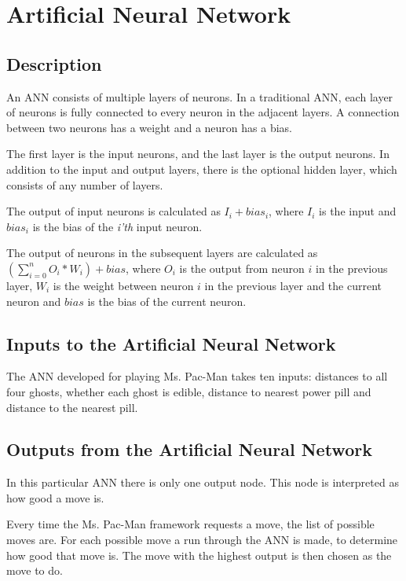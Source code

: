 
\section{Artificial Neural Network}
\subsection{Description}
An ANN consists of multiple layers of neurons. In a traditional ANN, each layer of neurons is fully connected to every neuron in the adjacent layers. A connection between two neurons has a weight and a neuron has a bias. 

The first layer is the input neurons, and the last layer is the output neurons. In addition to the input and output layers, there is the optional hidden layer, which consists of any number of layers.

The output of input neurons is calculated as $ I_i + bias_i $, where $I_i$ is the input and $bias_i$ is the bias of the \textit{i'th} input neuron.

The output of neurons in the subsequent layers are calculated as $ \left( \displaystyle \sum_{i = 0}^{n} O_i * W_i \right) + bias $, where $O_i$ is the output from neuron $i$ in the previous layer, $W_i$ is the weight between neuron $i$ in the previous layer and the current neuron and $bias$ is the bias of the current neuron.

\subsection{Inputs to the Artificial Neural Network}
\label{subsub:ann_inputs}
The ANN developed for playing Ms. Pac-Man takes ten inputs: distances to all four ghosts, whether each ghost is edible, distance to nearest power pill and distance to the nearest pill.

\subsection{Outputs from the Artificial Neural Network}
\label{subsub:ann_outputs}
In this particular ANN there is only one output node. This node is interpreted as how good a move is.

Every time the Ms. Pac-Man framework requests a move, the list of possible moves are. For each possible move a run through the ANN is made, to determine how good that move is. The move with the highest output is then chosen as the move to do.

